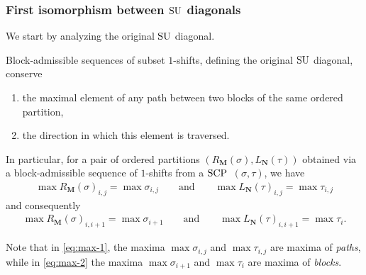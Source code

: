 
\subsubsection{First isomorphism between $\mathrm{SU}$ diagonals}

We start by analyzing the original $\mathrm{SU}$ diagonal.

\begin{proposition} 
\label{prop:SU-preserves-max}
Block-admissible sequences of subset $1$-shifts, defining the original $\mathrm{SU}$ diagonal, conserve 
\begin{enumerate}
\item the maximal element of any path between two blocks of the same ordered partition,
\item the direction in which this element is traversed. 
\end{enumerate}
In particular, for a pair of ordered partitions $(R_{\mathbf{M}}(\sigma),L_{\mathbf{N}}(\tau))$ obtained via a block-admissible sequence of $1$-shifts from a $\mathrm{SCP}$~$(\sigma,\tau)$, we have
\begin{align}
\label{eq:max-1}
\max R_{\mathbf{M}}(\sigma)_{i,j} = \max \sigma_{i,j} \qquad \text{and} \qquad \max L_{\mathbf{N}}(\tau)_{i,j} = \max \tau_{i,j} \tag{P}
\end{align}
and consequently
\begin{align}
\label{eq:max-2}
\max R_{\mathbf{M}}(\sigma)_{i,i+1} = \max \sigma_{i+1} \qquad \text{and}\qquad \max L_{\mathbf{N}}(\tau)_{i,i+1} = \max \tau_{i} . \tag{B}
\end{align}
\end{proposition}

Note that in \cref{eq:max-1}, the maxima $\max \sigma_{i,j}$ and $\max \tau_{i,j}$ are maxima of \emph{paths}, while in \cref{eq:max-2} the maxima $\max \sigma_{i+1}$ and $\max \tau_{i}$ are maxima of \emph{blocks}.

